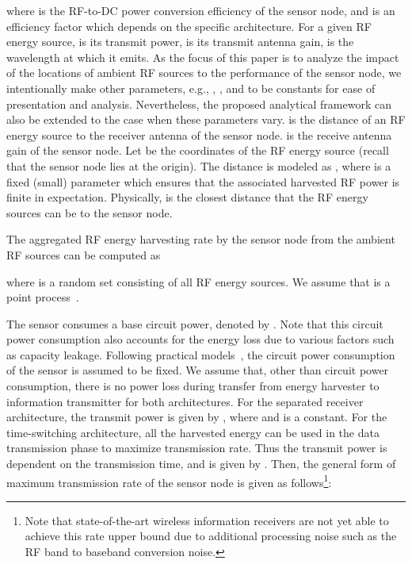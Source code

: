 \documentclass[12pt,draftclsnofoot,onecolumn]{IEEEtran}
\begin{document}
where  is the RF-to-DC power conversion efficiency of the sensor node, and  is an efficiency factor which depends on the specific architecture.
For a given RF energy source,  is its transmit power,  is its transmit antenna gain,  is the wavelength at which it emits. As the focus of this paper is to analyze the impact of the locations of ambient RF sources to the performance of the sensor node, we intentionally make other parameters, e.g., , , and  to be constants for ease of presentation and analysis. Nevertheless, the proposed analytical framework can also be extended to the case when these parameters vary.  is the distance of an RF energy source  to the receiver antenna of the sensor node.  is the receive antenna gain of  the sensor node. Let  be the coordinates of the RF energy source  (recall that the sensor node lies at the origin). The distance is modeled as , where  is a fixed (small) parameter which ensures that the associated harvested RF power is finite in expectation. Physically,  is the closest distance that the RF energy sources can be to the sensor node.

The aggregated RF energy harvesting rate by the sensor node from the ambient RF sources can be computed as

where  is a random set consisting of all RF energy sources. We assume that  is a point process~\cite{Kallenberg}.
 



The sensor consumes a base circuit power, denoted by . Note that this circuit power consumption also accounts for the energy loss due to various factors such as capacity leakage. Following practical models~\cite{G2009Miao}, the circuit power consumption of the sensor is assumed to be fixed. We assume that, other than circuit power consumption, there is no power loss during transfer from energy harvester to information transmitter for both architectures.
For the separated receiver architecture, the transmit power is given by , where  and  is a constant. For the time-switching architecture, all the harvested energy can be used in the data transmission phase to maximize transmission rate. Thus the transmit power is dependent on the transmission time, and is given by .
Then, the general form of maximum transmission rate of the sensor node is given as follows\footnote{Note that state-of-the-art wireless information receivers are not yet able to achieve this rate upper bound due to additional processing noise such as the RF band to baseband conversion noise.}:
\end{document}
